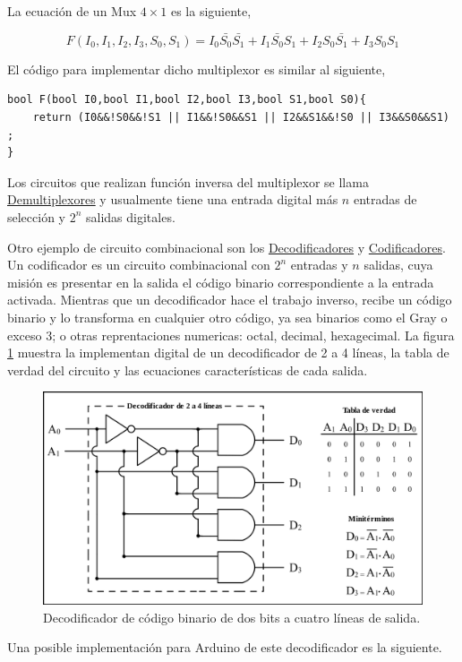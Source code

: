 La ecuación de un Mux $4 \times 1$ es la siguiente,

\begin{equation}
	F(I_0,I_1,I_2,I_3,S_0,S_1)=I_0\bar{S_0}\bar{S_1}+I_1\bar{S_0}S_1+I_2S_0\bar{S_1}+I_3S_0S_1
\end{equation} 

El código para implementar dicho multiplexor es similar al siguiente,
{\footnotesize 
\begin{lstlisting}[language=Arduino,numbers=none, showstringspaces=false]
bool F(bool I0,bool I1,bool I2,bool I3,bool S1,bool S0){
	return (I0&&!S0&&!S1 || I1&&!S0&&S1 || I2&&S1&&!S0 || I3&&S0&&S1) ;
}
\end{lstlisting}
}
Los circuitos que realizan función inversa del multiplexor se  llama \href{https://es.wikipedia.org/wiki/Demultiplexor}{Demultiplexores}  y usualmente tiene una entrada digital más $n$ entradas de selección y $2^{n}$ salidas digitales.

Otro ejemplo de circuito combinacional son los \href{URL}{Decodificadores} y \href{https://es.wikipedia.org/wiki/Codificador}{Codificadores}.  Un codificador es un circuito combinacional con $2^{n}$ entradas y $n$ salidas, cuya misión es presentar en la salida el código binario correspondiente a la entrada activada. Mientras que un decodificador hace el trabajo inverso, recibe un código binario y lo transforma en cualquier otro código, ya sea  binarios como el Gray o exceso 3; o otras reprentaciones numericas: octal, decimal, hexagecimal. La figura \ref{fig:decoderexample} muestra la implementan digital de un decodificador de 2 a 4 líneas, la tabla de verdad del circuito y las ecuaciones características de cada salida. 
\begin{figure}
	\centering
	\includegraphics[width=0.7\linewidth]{fig/Decoder_Example.png}
	\caption{Decodificador de código binario de dos bits a cuatro líneas de salida.  }
	\label{fig:decoderexample}
\end{figure}

Una posible implementación para Arduino de este decodificador es la siguiente.

